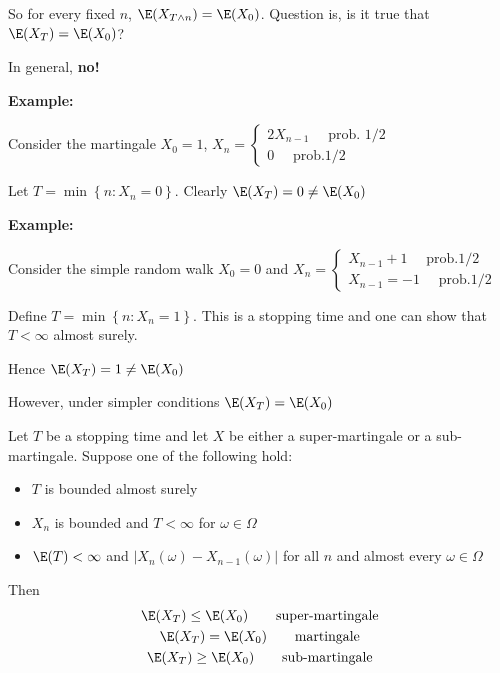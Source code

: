 \par\bigskip
\noindent So for every fixed $n$, $\E(X_{T\wedge n}) = \E(X_0)$. Question is, is it true that $\E(X_T) = \E(X_0)$?\par
\noindent In general, \textbf{no!}
\par\bigskip
\noindent\textbf{Example:}\par
\noindent Consider the martingale $X_0=1$, $X_n = \begin{cases}2X_{n-1}\quad\text{ prob. }1/2\\0\quad\text{ prob.} 1/2\end{cases}$\par
\noindent Let $T = \min\left\{n:X_n=0\right\}$. Clearly $\E(X_T) = 0\neq \E(X_0)$
\par\bigskip
\noindent\textbf{Example:}\par
\noindent Consider the simple random walk $X_0=0$ and $X_n = \begin{cases}X_{n-1}+1\quad\text{ prob.} 1/2\\X_{n-1} = -1\quad\text{ prob.} 1/2\end{cases}$\par
\noindent Define $T = \min\left\{n:X_n = 1\right\}$. This is a stopping time and one can show that $T<\infty$ almost surely.\par
\noindent Hence $\E(X_T) = 1\neq \E(X_0)$\par
\noindent However, under simpler conditions $\E(X_T) = \E(X_0)$
\par\bigskip
\begin{theo}{}
  Let $T$ be a stopping time and let $X$ be either a super-martingale or a sub-martingale. Suppose one of the following hold:\par
  \begin{itemize}
    \item $T$ is bounded almost surely
      \item $X_n$ is bounded and $T<\infty$ for $\omega\in\Omega$
    \item $\E(T)<\infty$ and $\left|X_n(\omega)-X_{n-1}(\omega)\right|$ for all $n$ and almost every $\omega\in\Omega$
  \end{itemize}
  \par\bigskip
  \noindent Then
  \begin{equation*}
    \begin{gathered}
      \E(X_T) \leq \E(X_0)\qquad\text{super-martingale}\\
      \E(X_T) = \E(X_0)\qquad\text{martingale}\\
      \E(X_T) \geq \E(X_0)\qquad\text{sub-martingale}
    \end{gathered}
  \end{equation*}
\end{theo}

